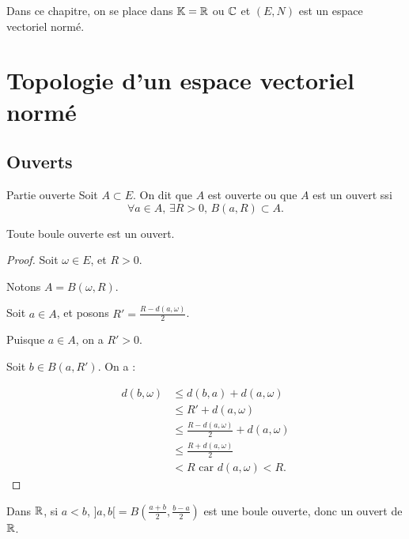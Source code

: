 
Dans ce chapitre, on se place dans $\mathbb{K} = \mathbb{R}$ ou $\mathbb{C}$ et $(E, N)$ est un espace vectoriel normé.

\section{Topologie d'un espace vectoriel normé}

\subsection{Ouverts }

\begin{definition}{Partie ouverte }{}
    Soit $A \subset E$. On dit que $A$ est ouverte ou que $A$ est un ouvert ssi 
    $$ \forall a \in A, \, \exists R > 0, \, B(a, R) \subset A.$$
\end{definition}

\begin{propositionnt}{}{}
    Toute boule ouverte est un ouvert.
\end{propositionnt}


\begin{proof}
    Soit $\omega \in E$, et $R > 0$. 

    Notons $A = B(\omega, R)$.

    Soit $a \in A$, et posons $R' = \frac{R - d(a, \omega)}{2}$. 

    Puisque $a \in A$, on a $R' > 0$.

    Soit $b \in B(a, R')$. On a : 

    \begin{align*}
        d(b, \omega) & \leqslant d(b, a) + d(a, \omega) \\
        & \leqslant R' + d(a, \omega) \\
        & \leqslant \frac{R - d(a, \omega)}{2 } + d(a, \omega) \\
        & \leqslant \frac{R + d(a, \omega)}{2} \\
        & < R \text{ car } d(a, \omega) < R.
    \end{align*}

\end{proof}

\begin{exemple}
    Dans $\mathbb{R}$, si $a < b$, $]a, b[ = B\left(\frac{a+b}{2}, \frac{b-a}{2}\right)$ est une boule 
    ouverte, donc un ouvert de $\mathbb{R}$.
\end{exemple}

